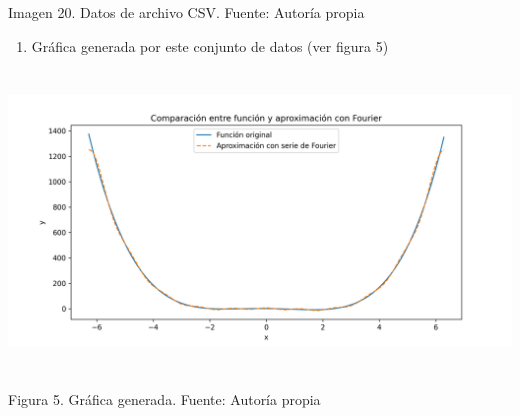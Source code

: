 Imagen 20. Datos de archivo CSV. Fuente: Autoría propia

\begin{enumerate} \def\labelenumi{\arabic{enumi}.} \setcounter{enumi}{2} \item   Gráfica generada por este conjunto de datos (ver figura 5) \end{enumerate}

\includegraphics[width=6.26772in,height=3.13889in]{media/image30.png}

Figura 5. Gráfica generada. Fuente: Autoría propia
